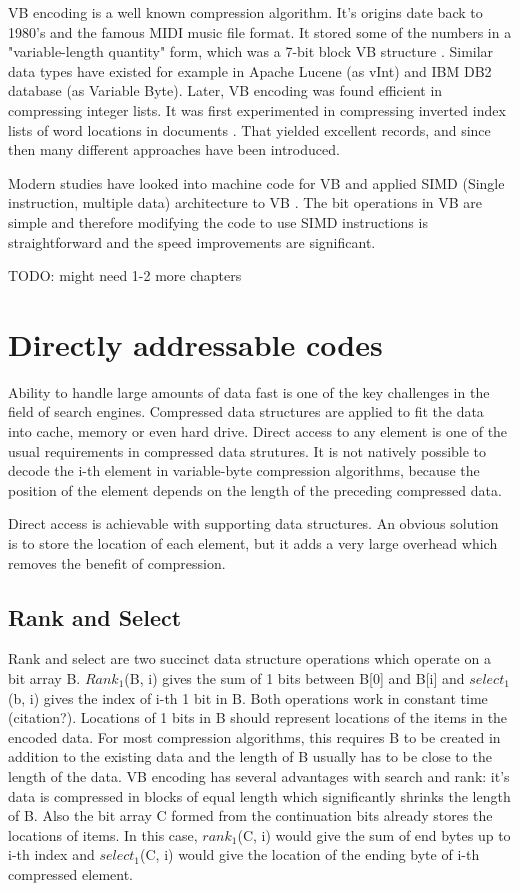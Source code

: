 VB encoding is a well known compression algorithm. It's origins date back to 1980's and the famous MIDI music file format. It stored some of the numbers
in a "variable-length quantity" form, which was a 7-bit block VB structure \citep{Mid96}. Similar data types have existed for example in Apache Lucene 
(as vInt) and IBM DB2 database (as Variable Byte). Later, VB encoding was found efficient in compressing integer lists. It was first experimented in 
compressing inverted index lists of word locations in documents \citep{Sch02}. That yielded excellent records, and since then many different approaches 
have been introduced. 

Modern studies have looked into machine code for VB and applied SIMD (Single instruction, multiple data) architecture to VB \citep{Lem18,Pla15}. The bit 
operations in VB are simple and therefore modifying the code to use SIMD instructions is straightforward and the speed improvements are significant. 

TODO: might need 1-2 more chapters


\chapter{Directly addressable codes} \label{chapter:DAC}

Ability to handle large amounts of data fast is one of the key challenges in the field of search engines. Compressed data structures are applied to fit the 
data into cache, memory or even hard drive. Direct access to any element is one of the usual requirements in compressed data strutures. It is not natively
possible to decode the i-th element in variable-byte compression algorithms, because the position of the element depends on the length of the preceding 
compressed data. 

Direct access is achievable with supporting data structures. An obvious solution is to store the location of each element, but it adds a very large overhead 
which removes the benefit of compression.

\section{Rank and Select}
Rank and select are two succinct data structure operations which operate on a bit array B. $Rank_1$(B, i) gives the sum of 1 bits between B[0] and B[i] and 
$select_1$(b, i) gives the index of i-th 1 bit in B. Both operations work in constant time (citation?). Locations of 1 bits in B should represent locations 
of the items in the encoded data. For most compression algorithms, this requires B to be created in addition to the existing data and the length of B usually 
has to be close to the length of the data. VB encoding has several advantages with search and rank: it's data is compressed in blocks of equal length which 
significantly shrinks the length of B. Also the bit array C formed from the continuation bits already stores the locations of items. In this case, $rank_1$(C, i) 
would give the sum of end bytes up to i-th index and $select_1$(C, i) would give the location of the ending byte of i-th compressed element.

